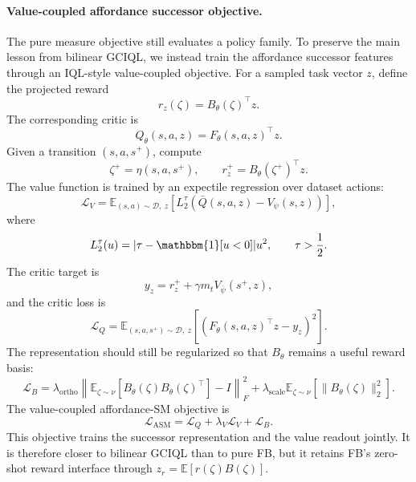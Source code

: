 \paragraph{Value-coupled affordance successor objective.}
The pure measure objective still evaluates a policy family.  To preserve the main
lesson from bilinear GCIQL, we instead train the affordance successor features
through an IQL-style value-coupled objective.  For a sampled task vector \(z\),
define the projected reward
\[
r_z(\zeta)
=
B_\theta(\zeta)^\top z.
\]
The corresponding critic is
\[
Q_\theta(s,a,z)
=
F_\theta(s,a,z)^\top z.
\]
Given a transition \((s,a,s^+)\), compute
\[
\zeta^+ = \eta(s,a,s^+),
\qquad
r_z^+ = B_\theta(\zeta^+)^\top z.
\]
The value function is trained by an expectile regression over dataset actions:
\[
\mathcal{L}_V
=
\mathbb{E}_{(s,a)\sim\mathcal{D},\ z}
\left[
L_2^\tau
\left(
\bar Q(s,a,z)-V_\psi(s,z)
\right)
\right],
\]
where
\[
L_2^\tau(u)
=
|\tau-\mathbbm{1}[u<0]|u^2,
\qquad
\tau>\frac{1}{2}.
\]
The critic target is
\[
y_z
=
r_z^+
+
\gamma m_t V_{\bar\psi}(s^+,z),
\]
and the critic loss is
\[
\mathcal{L}_Q
=
\mathbb{E}_{(s,a,s^+)\sim\mathcal{D},\ z}
\left[
\left(
F_\theta(s,a,z)^\top z
-
y_z
\right)^2
\right].
\]
The representation should still be regularized so that \(B_\theta\) remains a useful
reward basis:
\[
\mathcal{L}_{B}
=
\lambda_{\mathrm{ortho}}
\left\|
\mathbb{E}_{\zeta\sim\nu}
\left[
B_\theta(\zeta)B_\theta(\zeta)^\top
\right]
-
I
\right\|_F^2
+
\lambda_{\mathrm{scale}}
\mathbb{E}_{\zeta\sim\nu}
\left[
\|B_\theta(\zeta)\|_2^2
\right].
\]
The value-coupled affordance-SM objective is
\[
\mathcal{L}_{\mathrm{ASM}}
=
\mathcal{L}_Q
+
\lambda_V\mathcal{L}_V
+
\mathcal{L}_{B}.
\]
This objective trains the successor representation and the value readout jointly.
It is therefore closer to bilinear GCIQL than to pure FB, but it retains FB's
zero-shot reward interface through \(z_r=\mathbb{E}[r(\zeta)B(\zeta)]\).

